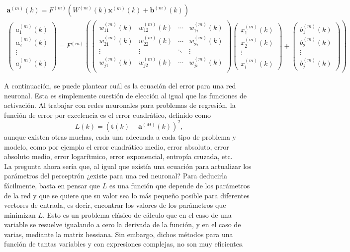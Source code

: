 		\begin{equation}
			\label{eq:prop}
			\begin{gathered}
				\textbf{a}^{(m)}(k) = F^{(m)}\left(W^{(m)}(k)\textbf{x}^{(m)}(k) + \textbf{b}^{(m)}(k)\right)\\
				\begin{pmatrix}
					a_1^{(m)}(k)\\a_2^{(m)}(k)\\\vdots\\a_j^{(m)}(k)
				\end{pmatrix} = F^{(m)}\left(
				\begin{pmatrix}
					w_{11}^{(m)}(k) & w_{12}^{(m)}(k) & \cdots & w_{1i}^{(m)}(k)\\
					w_{21}^{(m)}(k) & w_{22}^{(m)}(k) & \cdots & w_{2i}^{(m)}(k)\\
					\vdots & \vdots & \ddots & \vdots\\
					w_{j1}^{(m)}(k) & w_{j2}^{(m)}(k) & \cdots & w_{ji}^{(m)}(k)\\
				\end{pmatrix}
				\begin{pmatrix}
					x_1^{(m)}(k)\\x_2^{(m)}(k)\\\vdots\\x_i^{(m)}(k)
				\end{pmatrix} + 
				\begin{pmatrix}
					b_1^{(m)}(k)\\b_2^{(m)}(k)\\\vdots\\b_j^{(m)}(k)
				\end{pmatrix}\right)
			\end{gathered}
		\end{equation}
		
		A continuación, se puede plantear cuál es la ecuación del error para una red neuronal. Esta es simplemente cuestión de elección al igual que las funciones de activación. Al trabajar con redes neuronales para problemas de regresión, la función de error por excelencia es el error cuadrático, definido como
		$$
		L(k) = (\textbf{t}(k) - \textbf{a}^{(M)}(k))^2, 
		$$
		aunque existen otras muchas, cada una adecuada a cada tipo de problema y modelo, como por ejemplo el error cuadrático medio, error absoluto, error absoluto medio, error logarítmico, error exponencial, entropía cruzada, etc\cite{funcionesError}.\\
		
		La pregunta ahora sería que, al igual que existía una ecuación para actualizar los parámetros del perceptrón ¿existe para una red neuronal? Para deducirla fácilmente, basta en pensar que $L$ es una función que depende de los parámetros de la red y que se quiere que su valor sea lo más pequeño posible para diferentes vectores de entrada, es decir, encontrar los valores de los parámetros que minimizan $L$. Esto es un problema clásico de cálculo que en el caso de una variable se resuelve igualando a cero la derivada de la función, y en el caso de varias, mediante la matriz hessiana. Sin embargo, dichos métodos para una función de tantas variables y con expresiones complejas, no son muy eficientes. \\
		
